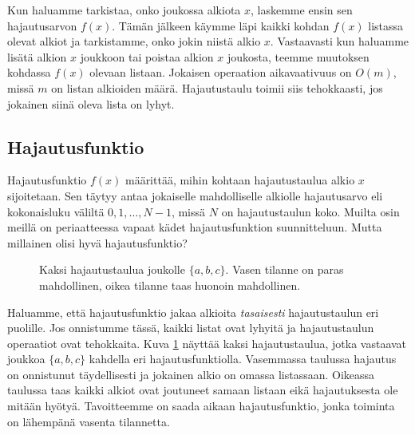 Kun haluamme tarkistaa, onko joukossa alkiota $x$,
laskemme ensin sen hajautusarvon $f(x)$.
Tämän jälkeen käymme läpi kaikki kohdan $f(x)$
listassa olevat alkiot ja tarkistamme,
onko jokin niistä alkio $x$.
Vastaavasti kun haluamme lisätä alkion $x$ joukkoon
tai poistaa alkion $x$ joukosta,
teemme muutoksen kohdassa $f(x)$ olevaan listaan.
Jokaisen operaation aikavaativuus on $O(m)$,
missä $m$ on listan alkioiden määrä.
Hajautustaulu toimii siis tehokkaasti, jos jokainen
siinä oleva lista on lyhyt.

\subsection{Hajautusfunktio}

Hajautusfunktio $f(x)$ määrittää, mihin kohtaan hajautustaulua
alkio $x$ sijoitetaan.
Sen täytyy antaa jokaiselle mahdolliselle alkiolle
hajautusarvo eli kokonaisluku väliltä $0,1,\dots,N-1$,
missä $N$ on hajautustaulun koko.
Muilta osin meillä on periaatteessa vapaat kädet
hajautusfunktion suunnitteluun.
Mutta millainen olisi hyvä hajautusfunktio?

\begin{figure}
\center
{}
\caption{Kaksi hajautustaulua joukolle $\{a,b,c\}$.
Vasen tilanne on paras mahdollinen, oikea tilanne taas
huonoin mahdollinen.}
\label{fig:hajjak}
\end{figure}

Haluamme, että hajautusfunktio jakaa alkioita \emph{tasaisesti}
hajautustaulun eri puolille.
Jos onnistumme tässä, kaikki listat ovat lyhyitä ja
hajautustaulun operaatiot ovat tehokkaita.
Kuva \ref{fig:hajjak} näyttää kaksi hajautustaulua, jotka vastaavat
joukkoa $\{a,b,c\}$ kahdella eri hajautusfunktiolla.
Vasemmassa taulussa hajautus on onnistunut täydellisesti
ja jokainen alkio on omassa listassaan.
Oikeassa taulussa taas kaikki alkiot ovat joutuneet samaan
listaan eikä hajautuksesta ole mitään hyötyä.
Tavoitteemme on saada aikaan hajautusfunktio,
jonka toiminta on lähempänä vasenta tilannetta.

